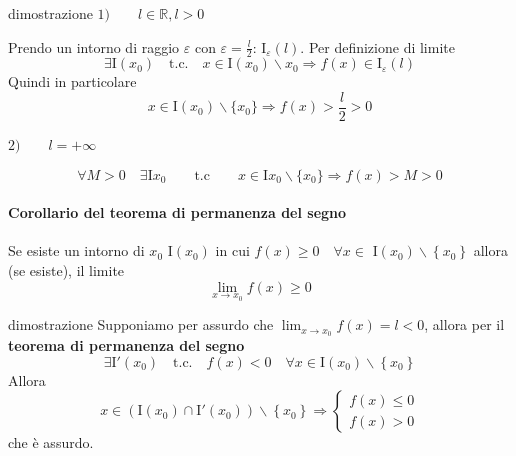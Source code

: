 \documentclass[x11names]{article}
\begin{document}
	\begin{es}{dimostrazione}
		$1) \qquad l \in \mathbb{R}, l > 0 \qquad $ 
		
		\begin{center}
			
		\end{center}
		
		Prendo un intorno di raggio $\varepsilon$ con $\varepsilon = \frac{l}{2}$: $\text{I}_\varepsilon (l)$. Per definizione di limite
		\[
		\exists \text{I}(x_0) \quad \text{t.c.} \quad x \in \text{I}(x_0) \backslash x_0 \Longrightarrow f(x) \in \text{I}_\varepsilon (l)
		\]
		Quindi in particolare 
		\[
		x \in \text{I}(x_0) \backslash \{x_0\} \Longrightarrow f(x) > \frac{l}{2} > 0
		\]
		
		$2) \qquad l = + \infty \qquad$ 
		\begin{center}
			
		\end{center}
		\[
		\forall M > 0 \quad \exists \text{I}{x_0} \qquad \text{t.c} \qquad x \in \text{I}{x_0} \backslash \{x_0\} \Longrightarrow f(x) > M > 0
		\]
	\end{es}
	\paragraph{Corollario del teorema di permanenza del segno}
	Se esiste un intorno di $x_0$ I$(x_0)$ in cui $f(x) \geq 0 \quad \forall x \in$ I$(x_0) \backslash \left\{x_0\right\}$ allora (se esiste), il limite
	\[
	\lim_{x \to x_0}f(x) \geq 0
	\]
	\begin{es}{dimostrazione}
		Supponiamo per assurdo che $\lim_{x \to x_0}f(x) = l < 0$, allora per il \textbf{teorema di permanenza del segno}
		\[
		\exists \text{I}'(x_0) \quad \text{t.c.} \quad f(x) <0 \quad \forall x \in \text{I}(x_0) \backslash \left\{x_0\right\}
		\]
		Allora 
		\[
		x \in \left(\text{I}(x_0) \cap \text{I}'(x_0)\right)\backslash\left\{x_0\right\} \Longrightarrow \begin{cases}
			f(x) \leq 0 \\
			f(x) > 0
		\end{cases}
		\]
		che è assurdo.
	\end{es}
	
\end{document}
